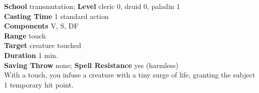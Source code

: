 \textbf{School} transmutation; \textbf{Level} cleric 0, druid 0, paladin 1\\
\textbf{Casting Time} 1 standard action\\
\textbf{Components} V, S, DF\\
\textbf{Range} touch\\
\textbf{Target} creature touched\\
\textbf{Duration} 1 min.\\
\textbf{Saving Throw} none; \textbf{Spell Resistance} yes (harmless)\\
With a touch, you infuse a creature with a tiny surge of life, granting the subject 1 temporary hit point.\\
